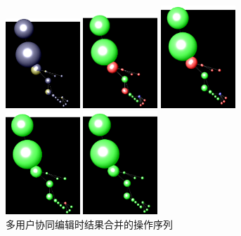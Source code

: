 \begin{figure}[!ht]
\begin{minipage}[t]{0.19\linewidth}
    \centering  
    \includegraphics[width=2.8cm]{images/a0}   
\end{minipage}  
\begin{minipage}[t]{0.19\linewidth} 
    \centering  
    \includegraphics[width=2.8cm]{images/a1}  
\end{minipage} 
\begin{minipage}[t]{0.19\linewidth}
    \centering  
    \includegraphics[width=2.8cm]{images/a2}    
\end{minipage}   
\begin{minipage}[t]{0.19\linewidth}
    \centering  
    \includegraphics[width=2.8cm]{images/a3}   
\end{minipage}   
\begin{minipage}[t]{0.19\linewidth}
    \centering  
    \includegraphics[width=2.8cm]{images/a4}   
\end{minipage} 
\caption{多用户协同编辑时结果合并的操作序列}
\label{merge}     
\end{figure}


